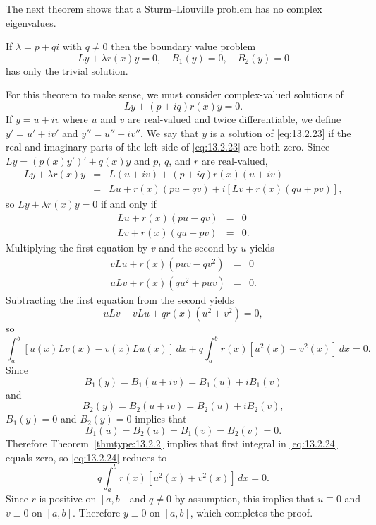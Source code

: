 The next theorem shows that a Sturm--Liouville problem has no complex eigenvalues.

\begin{theorem}
  \color{blue}
  \label{thmtype:13.2.3} If $\lambda=p+qi$ with $q\ne0$ then the boundary value problem
  \[
    Ly+\lambda r(x)y=0,\quad B_{1}(y)=0,\quad B_{2}(y)=0
  \]
  has only the trivial solution.
\end{theorem}

\proof For this theorem to make sense, we must consider complex-valued solutions of
\begin{equation}
  \label{eq:13.2.23}Ly+(p+iq)r(x)y=0.
\end{equation}
If $y=u+iv$ where $u$ and $v$ are real-valued and twice differentiable, we define $y'=u'+iv'$ and
$y''=u''+iv''$. We say that $y$ is a solution of \eqref{eq:13.2.23} if the real and imaginary parts
of the left side of \eqref{eq:13.2.23} are both zero. Since $Ly=(p(x)y')'+q(x)y$ and $p$, $q$, and
$r$ are real-valued,
\begin{eqnarray*}
  Ly+\lambda r(x)y & = & L(u+iv)+(p+iq)r(x)(u+iv) \\
                   & = & Lu+r(x)(pu-qv)+i[Lv+r(x)(qu+pv)],
\end{eqnarray*}
so $Ly+\lambda r(x)y=0$ if and only if
\begin{eqnarray*}
  Lu+r(x)(pu-qv) & = & 0 \\
  Lv+r(x)(qu+pv) & = & 0.
\end{eqnarray*}
Multiplying the first equation by $v$ and the second by $u$ yields
\begin{eqnarray*}
  vLu+r(x)(puv-qv^{2}) & = & 0 \\
  uLv+r(x)(qu^{2}+puv) & = & 0.
\end{eqnarray*}
Subtracting the first equation from the second yields
\[
  uLv-vLu+qr(x)(u^{2}+v^{2})=0,
\]
so
\begin{equation}
  \label{eq:13.2.24}\int_{a}^{b}[u(x)Lv(x)-v(x)Lu(x)]\,dx+ q\int_{a}^{b}r(x)[u^{2}(x)+v^{2}(x)]\,dx=0.
\end{equation}
Since
\[
  B_{1}(y)=B_{1}(u+iv)=B_{1}(u)+iB_{1}(v)
\]
and
\[
  B_{2}(y)=B_{2}(u+iv)=B_{2}(u)+iB_{2}(v),
\]
$B_{1}(y)=0$ and $B_{2}(y)=0$ implies that
\[
  B_{1}(u)=B_{2}(u)=B_{1}(v)=B_{2}(v)=0.
\]
Therefore Theorem~\ref{thmtype:13.2.2} implies that first integral in \eqref{eq:13.2.24} equals
zero, so \eqref{eq:13.2.24} reduces to
\[
  q\int_{a}^{b}r(x)[u^{2}(x)+v^{2}(x)]\,dx=0.
\]
Since $r$ is positive on $[a,b]$ and $q\ne0$ by assumption, this implies that $u\equiv0$ and
$v\equiv0$ on $[a,b]$. Therefore $y\equiv0$ on $[a,b]$, which completes the proof.

